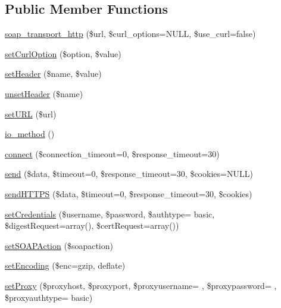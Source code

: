 \subsection*{Public Member Functions}
\begin{DoxyCompactItemize}
\item 
\hyperlink{classsoap__transport__http_aa723d51da4074927836863877821ecfd}{soap\+\_\+transport\+\_\+http} (\$url, \$curl\+\_\+options=N\+U\+L\+L, \$use\+\_\+curl=false)
\item 
\hyperlink{classsoap__transport__http_a314f6d38ace6f3d92d0d1d7e8cfc0aaf}{set\+Curl\+Option} (\$option, \$value)
\item 
\hyperlink{classsoap__transport__http_a48ca020ea3da5f108feab0fa8efde068}{set\+Header} (\$name, \$value)
\item 
\hyperlink{classsoap__transport__http_ab3e7f395271d99fe451c42201519c2a9}{unset\+Header} (\$name)
\item 
\hyperlink{classsoap__transport__http_a5a4415db7a7e36f85a4d975c892b0470}{set\+U\+R\+L} (\$url)
\item 
\hyperlink{classsoap__transport__http_a83b4320b3379e742a3d064effff0728a}{io\+\_\+method} ()
\item 
\hyperlink{classsoap__transport__http_a8648865ea5c701e29c03c79af40a7ffc}{connect} (\$connection\+\_\+timeout=0, \$response\+\_\+timeout=30)
\item 
\hyperlink{classsoap__transport__http_a124252f4e9d206d86fcd6522854eb919}{send} (\$data, \$timeout=0, \$response\+\_\+timeout=30, \$cookies=N\+U\+L\+L)
\item 
\hyperlink{classsoap__transport__http_aa93a72fdc90b3535f17d471b7ccc3ffd}{send\+H\+T\+T\+P\+S} (\$data, \$timeout=0, \$response\+\_\+timeout=30, \$cookies)
\item 
\hyperlink{classsoap__transport__http_afc1032cca5010f0fefba2f0d5a9c4520}{set\+Credentials} (\$username, \$password, \$authtype= \textquotesingle{}basic\textquotesingle{}, \$digest\+Request=array(), \$cert\+Request=array())
\item 
\hyperlink{classsoap__transport__http_a792db42ef189835b80389a838fbf2cef}{set\+S\+O\+A\+P\+Action} (\$soapaction)
\item 
\hyperlink{classsoap__transport__http_a9dde5d06442abd355db3acbde021121d}{set\+Encoding} (\$enc=\textquotesingle{}gzip, deflate\textquotesingle{})
\item 
\hyperlink{classsoap__transport__http_a2b6751afa15d43fd627f7689b2997702}{set\+Proxy} (\$proxyhost, \$proxyport, \$proxyusername= \textquotesingle{}\textquotesingle{}, \$proxypassword= \textquotesingle{}\textquotesingle{}, \$proxyauthtype= \textquotesingle{}basic\textquotesingle{})

\end{DoxyCompactItemize}
